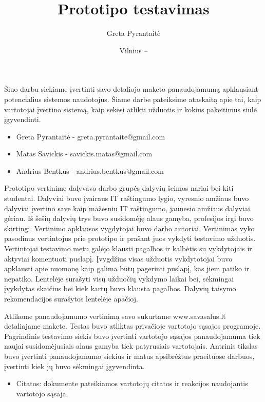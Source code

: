 \documentclass[oneside]{VUMIFPSkursinis}
\title{Prototipo testavimas}
\author{Greta Pyrantaitė}
\date{Vilnius – \the\year}
\begin{document}
\maketitle

Šiuo darbu siekiame įvertinti savo detaliojo maketo panaudojamumą apklausiant potencialius sistemos naudotojus. Šiame darbe pateiksime ataskaitą apie tai, kaip vartotojai įvertino sistemą, kaip sekėsi atlikti užduotis ir kokius pakeitimus siūlė įgyvendinti.

\begin{itemize}
	\item{Greta Pyrantaitė - greta.pyrantaite@gmail.com}
	\item{Matas Savickis - savickis.matas@gmail.com}
	\item{Andrius Bentkus - andrius.bentkus@gmail.com}
\end{itemize}

\tableofcontents


Prototipo vertinime dalyvavo darbo grupės dalyvių šeimos nariai bei kiti studentai.
Dalyviai buvo įvairaus IT raštingumo lygio, vyresnio amžiaus buvo dalyviai įvertino save kaip mažesniu IT raštingumo, jaunesio amžiaus dalyviai gėriau.
Iš šešių dalyvių trys buvo susidomėję alaus gamyba, profesijos irgi buvo skirtingi.
Vertinimo apklausos vygdytojai buvo darbo autoriai.
Vertinimas vyko pasodinus vertintojus prie prototipo ir prašant juos vykdyti testavimo užduotis.
Vertintojai testavimo metu galėjo klausti pagalbos ir kalbėtis su vykdytojais ir aktyviai komentuoti puslapį.
Įvygdžius visas užduotis vykdytotojai buvo apklausti apie nuomonę kaip galima būtų pagerinti puslapį, kas jiem patiko ir nepatiko.
Lentelėje surašyti visų užduočių vykdymo laikai bei, sėkmingai įvykdytas skaičius bei kiek kartų buvo klausta pagalbos.
Dalyvių taisymo rekomendacijos surašytos lentelėje apačioj.

Atlikome panaudojamumo vertinimą savo sukurtame www.savasalus.lt detaliajame makete. Testas buvo atliktas privačioje vartotojo sąsajos programoje.
		Pagrindinis testavimo siekis buvo įvertinti vartotojo sąsajos panaudojamuma tiek naujai susidomėjusiais alaus gamyba tiek patyrusiais vartotojais. Antrinis tikslas buvo įvertinti panaudojamumo siekius ir matus apsibrėžtus praeituose darbuos, įvertinti kiek jų buvo sėkmingai įgyvendinta.
		\begin{itemize}
			\item{Citatos: dokumente pateikiamos vartotojų citatos ir reakcijos naudojantis vartotojo sąsaja.}
		\end{itemize}
\end{document}
